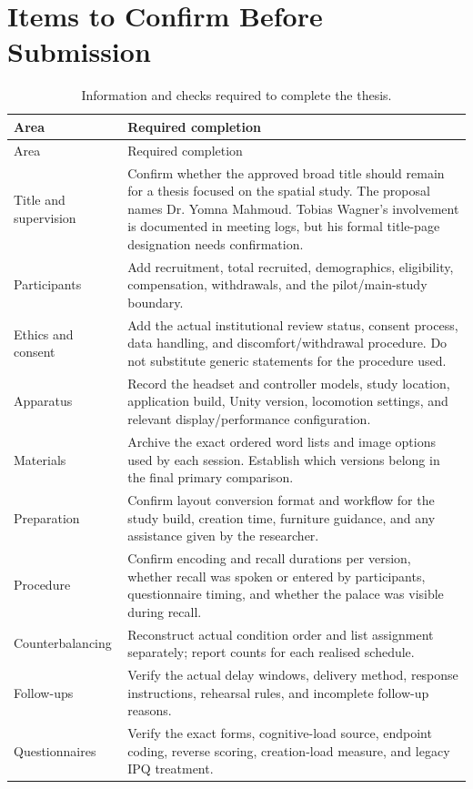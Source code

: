 \section{Items to Confirm Before Submission}
\begin{longtable}{@{}p{3.5cm}p{11.2cm}@{}}
\caption{Information and checks required to complete the thesis.}\label{tab:completion}\\
\toprule
Area & Required completion \\
\midrule
\endfirsthead
\toprule
Area & Required completion \\
\midrule
\endhead
Title and supervision & Confirm whether the approved broad title should remain for a thesis focused on the spatial study. The proposal names Dr. Yomna Mahmoud. Tobias Wagner's involvement is documented in meeting logs, but his formal title-page designation needs confirmation. \\
Participants & Add recruitment, total recruited, demographics, eligibility, compensation, withdrawals, and the pilot/main-study boundary. \\
Ethics and consent & Add the actual institutional review status, consent process, data handling, and discomfort/withdrawal procedure. Do not substitute generic statements for the procedure used. \\
Apparatus & Record the headset and controller models, study location, application build, Unity version, locomotion settings, and relevant display/performance configuration. \\
Materials & Archive the exact ordered word lists and image options used by each session. Establish which versions belong in the final primary comparison. \\
Preparation & Confirm layout conversion format and workflow for the study build, creation time, furniture guidance, and any assistance given by the researcher. \\
Procedure & Confirm encoding and recall durations per version, whether recall was spoken or entered by participants, questionnaire timing, and whether the palace was visible during recall. \\
Counterbalancing & Reconstruct actual condition order and list assignment separately; report counts for each realised schedule. \\
Follow-ups & Verify the actual delay windows, delivery method, response instructions, rehearsal rules, and incomplete follow-up reasons. \\
Questionnaires & Verify the exact forms, cognitive-load source, endpoint coding, reverse scoring, creation-load measure, and legacy IPQ treatment. \\

\end{longtable}
